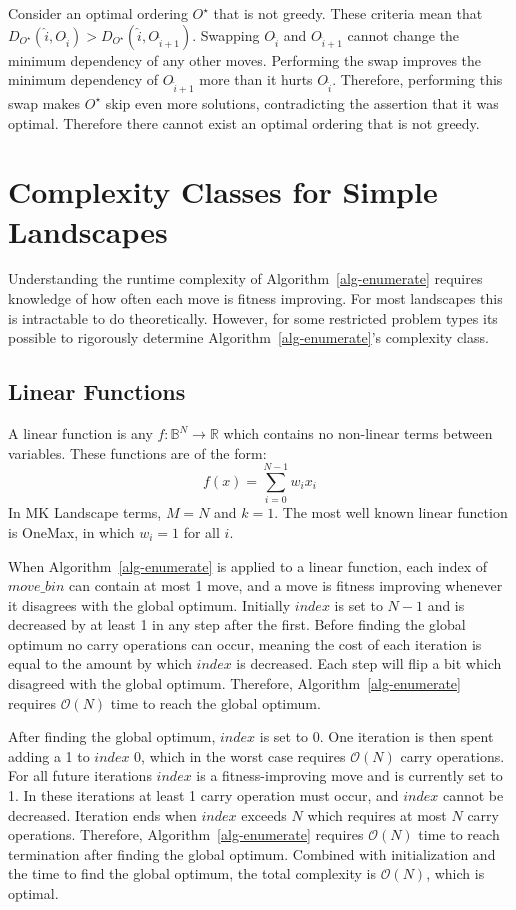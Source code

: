 \documentclass[runningheads,a4paper]{llncs}
\newcommand{\BigO}[1]{$\mathcal{O}{(#1)}$}
\begin{document}
Consider an optimal ordering $O^\star$ that is not greedy.
These criteria mean that $D_{O^\star}(\hat{i}, O_{\hat{i}}) > D_{O^\star}(\hat{i}, O_{\hat{i}+1})$.
Swapping $O_{\hat{i}}$ and $O_{\hat{i}+1}$ cannot change the minimum dependency of any other moves.
Performing the swap improves the minimum dependency of $O_{\hat{i}+1}$ more than it hurts
$O_{\hat{i}}$. Therefore, performing this swap makes $O^\star$ skip even more solutions,
contradicting the assertion that it was optimal. Therefore there cannot exist an optimal ordering that is not greedy.

\section{Complexity Classes for Simple Landscapes}
Understanding the runtime complexity of Algorithm~\ref{alg-enumerate} requires
knowledge of how often each move is fitness improving. For most landscapes
this is intractable to do theoretically. However, for some restricted problem
types its possible to rigorously determine Algorithm~\ref{alg-enumerate}'s complexity class.

\subsection{Linear Functions}
A linear function is any $f : \mathbb{B}^{N}\rightarrow \mathbb{R}$ which contains
no non-linear terms between variables. These functions are of the form:
\begin{equation}
  f(x) = \sum_{i=0}^{N-1} w_ix_i
  \label{eq-linear}
\end{equation}
In MK Landscape terms, $M=N$ and $k=1$. The most well known linear function is OneMax,
in which $w_i=1$ for all $i$.

When Algorithm~\ref{alg-enumerate} is applied to a linear
function, each index of $move\_bin$ can contain at most 1
move, and a move is fitness improving whenever it disagrees with the global optimum.
Initially $index$ is set to $N-1$ and is decreased by at least 1 in any step after the first.
Before finding the global optimum no carry operations can occur, meaning the
cost of each iteration is equal to the amount by which $index$ is decreased.
Each step will flip a bit which disagreed with the global optimum.
Therefore, Algorithm~\ref{alg-enumerate} requires \BigO{N} time to reach
the global optimum.

After finding the global optimum, $index$ is set to 0. One iteration
is then spent adding a 1 to $index$ 0, which in the worst case requires \BigO{N}
carry operations. For all future iterations $index$ is a fitness-improving move
and is currently set to 1. In these iterations at least 1 carry operation must
occur, and $index$ cannot be decreased. Iteration ends when $index$ exceeds $N$
which requires at most $N$ carry operations. Therefore, Algorithm~\ref{alg-enumerate}
requires \BigO{N} time to reach termination after finding the global optimum. Combined
with initialization and the time to find the global optimum, the total complexity is \BigO{N},
which is optimal.
\end{document}

